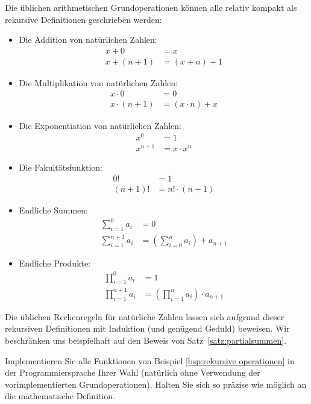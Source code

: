 \begin{bsp}\label{bsp:rekursive operationen}
Die üblichen arithmetischen Grundoperationen können alle relativ kompakt als rekursive Definitionen geschrieben werden:
\begin{itemize}
\item Die Addition von natürlichen Zahlen:
\begin{align*}
x+0&=x\\
x+(n+1)&=(x+n)+1
\end{align*}
\item Die Multiplikation von natürlichen Zahlen:
\begin{align*}
x\cdot 0 &= 0\\
x\cdot(n+1)&=(x\cdot n)+x
\end{align*}
\item Die Exponentiation von natürlichen Zahlen:
\begin{align*}
x^0&=1\\
x^{n+1}&=x\cdot x^{n}
\end{align*}
\item Die Fakultätsfunktion:
\begin{align*}
0!&=1\\
(n+1)!&=n!\cdot(n+1)
\end{align*}
\item Endliche Summen:
\begin{align*}
\sum_{i=1}^{0}a_i&=0\\
\sum_{i=1}^{n+1}a_{i}&=(\sum_{i=0}^na_i)+a_{n+1}
\end{align*}
\item Endliche Produkte:
\begin{align*}
\prod_{i=1}^{0}a_i&=1\\
\prod_{i=1}^{n+1}a_i&= (\prod_{i=1}^na_i)\cdot a_{n+1}
\end{align*}
\end{itemize}
\end{bsp}
Die üblichen Rechenregeln für natürliche Zahlen lassen sich aufgrund dieser rekursiven Definitionen mit Induktion (und genügend Geduld) beweisen. Wir beschränken uns beispielhaft auf den Beweis von Satz~\ref{satz:partialsummen}.

\begin{ueb}
	Implementieren Sie alle Funktionen von Beispiel \ref{bsp:rekursive operationen} in der Programmiersprache Ihrer Wahl (natürlich ohne Verwendung der vorimplementierten Grundoperationen). Halten Sie sich so präzise wie möglich an die mathematische Definition.
\end{ueb}
\begin{lsg}
\end{lsg}

